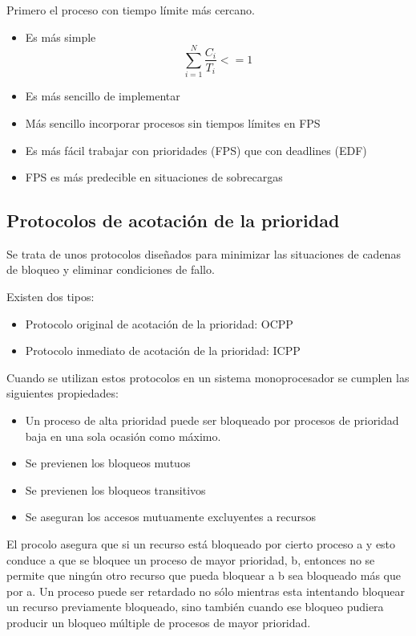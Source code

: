 Primero el proceso con tiempo límite más cercano.
\begin{itemize}
	\item Es más simple
\begin{equation}\label{key}
	\sum_{i=1}^{N}\frac{C_{i}}{T_{i}}<=1
\end{equation}
	\item Es más sencillo de implementar
	\item Más sencillo incorporar procesos sin tiempos límites en FPS
	\item Es más fácil trabajar con prioridades (FPS) que con deadlines
		(EDF)
	\item FPS es más predecible en situaciones de sobrecargas
\end{itemize}


\subsection{Protocolos de acotación de la prioridad}

Se trata de unos protocolos diseñados para minimizar las situaciones de cadenas
de bloqueo y eliminar condiciones de fallo.

Existen dos tipos:

\begin{itemize}
	\item Protocolo original de acotación de la prioridad: OCPP
	\item Protocolo inmediato de acotación de la prioridad: ICPP
\end{itemize}

Cuando se utilizan estos protocolos en un sistema monoprocesador se cumplen
las siguientes propiedades:

\begin{itemize}
	\item Un proceso de alta prioridad puede ser bloqueado por procesos de
		prioridad baja en una sola ocasión como máximo.
	\item Se previenen los bloqueos mutuos
	\item Se previenen los bloqueos transitivos
	\item Se aseguran los accesos mutuamente excluyentes a recursos
\end{itemize}

El procolo asegura que si un recurso está bloqueado por cierto proceso a y esto
conduce a que se bloquee un proceso de mayor prioridad, b, entonces no se
permite que ningún otro recurso que pueda bloquear a b sea bloqueado más que por
a. Un proceso puede ser retardado no sólo mientras esta intentando bloquear un
recurso previamente bloqueado, sino también cuando ese bloqueo pudiera producir
un bloqueo múltiple de procesos de mayor prioridad.

